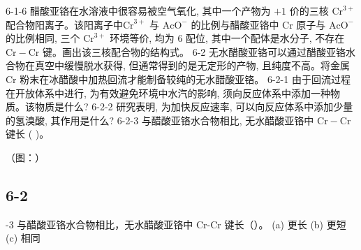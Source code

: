 6-1-6 醋酸亚铬在水溶液中很容易被空气氧化, 其中一个产物为 $+ 1$ 价的三核 $\mathrm{Cr}^{3+}$ 配合物阳离子。该阳离子中$\mathrm{Cr}^{3+}$ 与 $\mathrm{AcO}^{-}$ 的比例与醋酸亚铬中 $\mathrm{Cr}$ 原子与 $\mathrm{AcO}^{-}$ 的比例相同, 三个 $\mathrm{Cr}^{3+}$ 环境等价, 均为 6 配位, 其中一个配体是水分子, 不存在 $\mathrm{Cr}-\mathrm{Cr}$ 键。画出该三核配合物的结构式。
6-2 无水醋酸亚铬可以通过醋酸亚铬水合物在真空中缓慢脱水获得, 但通常得到的是无定形的产物, 且纯度不高。将金属 $\mathrm{Cr}$ 粉末在冰醋酸中加热回流才能制备较纯的无水醋酸亚铬。
6-2-1 由于回流过程在开放体系中进行, 为有效避免环境中水汽的影响, 须向反应体系中添加一种物质。该物质是什么?
6-2-2 研究表明, 为加快反应速率, 可以向反应体系中添加少量的氢溴酸, 其作用是什么?
6-2-3 与醋酸亚铬水合物相比, 无水醋酸亚铬中 $\mathrm{Cr}-\mathrm{Cr}$ 键长 ( )。

（图：）

\subsection*{6-2}
-3 与醋酸亚铬水合物相比，无水醋酸亚铬中 Cr-Cr 键长（）。 (a) 更长 (b) 更短 (c) 相同
